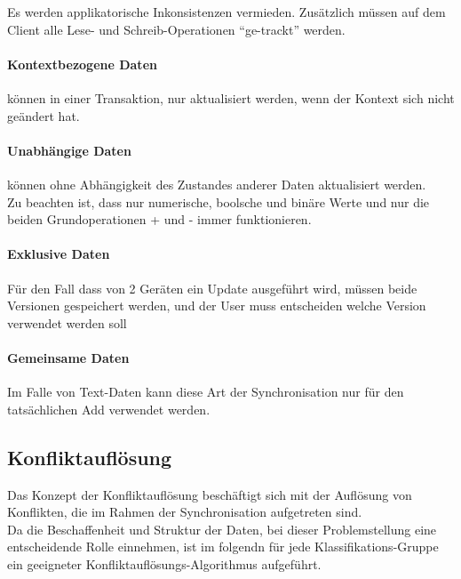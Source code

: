 \documentclass[oneside,11pt,parskip=half,ngerman]{scrreprt}
\begin{document}
Es werden applikatorische Inkonsistenzen vermieden. Zusätzlich müssen
auf dem Client alle Lese- und Schreib-Operationen \enquote{ge-trackt}
werden.

\paragraph{Kontextbezogene Daten}\label{kontextbezogene-daten-1}

können in einer Transaktion, nur aktualisiert werden, wenn der Kontext
sich nicht geändert hat.

\paragraph{Unabhängige Daten}\label{unabhuxe4ngige-daten-1}

können ohne Abhängigkeit des Zustandes anderer Daten aktualisiert
werden.\\Zu beachten ist, dass nur numerische, boolsche und binäre Werte
und nur die beiden Grundoperationen + und - immer funktionieren.

\paragraph{Exklusive Daten}\label{exklusive-daten-1}

Für den Fall dass von 2 Geräten ein Update ausgeführt wird, müssen beide
Versionen gespeichert werden, und der User muss entscheiden welche
Version verwendet werden soll

\paragraph{Gemeinsame Daten}\label{gemeinsame-daten-1}

Im Falle von Text-Daten kann diese Art der Synchronisation nur für den
tatsächlichen Add verwendet werden.

\subsection{Konfliktauflösung}\label{konfliktaufluxf6sung}

Das Konzept der Konfliktauflösung beschäftigt sich mit der Auflösung von
Konflikten, die im Rahmen der Synchronisation aufgetreten sind.\\Da die
Beschaffenheit und Struktur der Daten, bei dieser Problemstellung eine
entscheidende Rolle einnehmen, ist im folgendn für jede
Klassifikations-Gruppe ein geeigneter Konfliktauflösungs-Algorithmus
aufgeführt.
\end{document}
